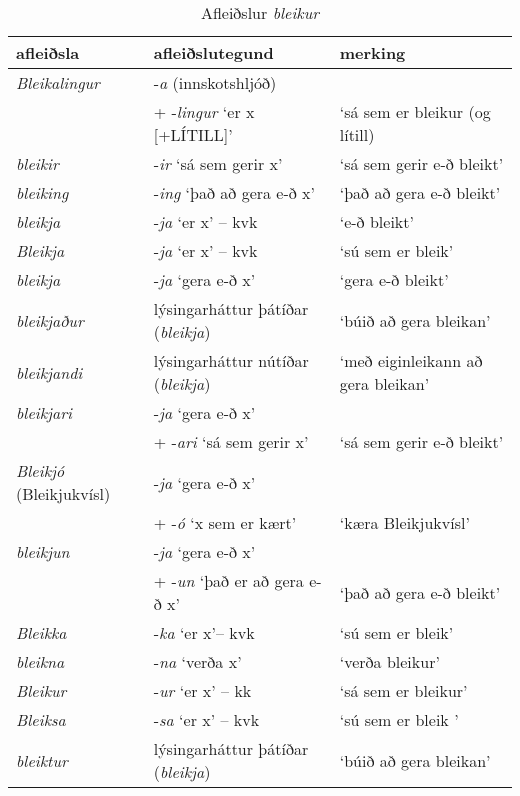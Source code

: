 \documentclass[../samsetningasafn.tex]{subfiles}
\begin{document}
\begin{table}[ht!]%
\begin{footnotesize}
\begin{tcolorbox}
	\begin{center}
	\begin{tabularx}{\textwidth}{Xll}
	\textbf{afleiðsla}		&	\textbf{afleiðslutegund}					&	\textbf{merking}	\\
	\hline
	\textit{Bleikalingur}		& 	-\textit{a} (innskotshljóð) 					&				\\
					&	+ -\textit{lingur} \lq er x [+LÍTILL]\rq{} & \lq sá sem er bleikur (og lítill)		\\ 
	\textit{bleikir}		&	-\textit{ir} \lq sá sem gerir x\rq			&	\lq sá sem gerir e-ð bleikt\rq	\\
	\textit{bleiking}		&	-\textit{ing} \lq það að gera e-ð x\rq		&	\lq það að gera e-ð bleikt\rq		\\
	\textit{bleikja}		&	-\textit{ja} \lq er x\rq{} -- kvk 			&	\lq e-ð bleikt\rq	\\
	\textit{Bleikja}		&	-\textit{ja} \lq er x\rq{} -- kvk 			&	\lq sú sem er bleik\rq	\\
	\textit{bleikja}		&	-\textit{ja} \lq gera e-ð x\rq				&	\lq gera e-ð bleikt\rq	\\
	\textit{bleikjaður}		&	lýsingarháttur þátíðar (\textit{bleikja})	&	\lq búið að gera bleikan\rq	\\
	\textit{bleikjandi}		&	lýsingarháttur nútíðar (\textit{bleikja})	&	\lq með eiginleikann að gera bleikan\rq	\\
	\textit{bleikjari}		&	-\textit{ja} \lq gera e-ð x\rq{} 		&		\\
					&	+ -\textit{ari} \lq sá sem gerir x\rq	&	\lq sá sem gerir e-ð bleikt\rq	\\
	\textit{Bleikjó} (Bleikjukvísl)		&	-\textit{ja} \lq gera e-ð x\rq{} 		&				\\
					&	+ -\textit{ó} \lq x sem er kært\rq{}	&		\lq kæra Bleikjukvísl\rq \\	
	\textit{bleikjun}		&	-\textit{ja} \lq gera e-ð x\rq{} 		&		\\
					&	+ -\textit{un} \lq það er að gera e-ð x\rq		&	\lq það að gera e-ð bleikt\rq	\\
	\textit{Bleikka}		&	-\textit{ka} \lq er x\rq -- kvk 				&	\lq sú sem er bleik\rq	\\
	\textit{bleikna}		&	-\textit{na} \lq verða x\rq				&	\lq verða bleikur\rq	\\
	\textit{Bleikur}		&	-\textit{ur} \lq er x\rq{} -- kk				&	\lq sá sem er bleikur\rq	\\
	\textit{Bleiksa}		&	-\textit{sa} \lq er x\rq{} -- kvk			&	\lq sú sem er bleik \rq	\\
	\textit{bleiktur}		&	lýsingarháttur þátíðar (\textit{bleikja})	&	\lq búið að gera bleikan\rq	\\
	\end{tabularx}
	\end{center}
\end{tcolorbox}
\end{footnotesize}
	\caption{Afleiðslur \textit{bleikur}}
	\label{tafla:blefl}
\end{table}

\clearpage
\end{document}
